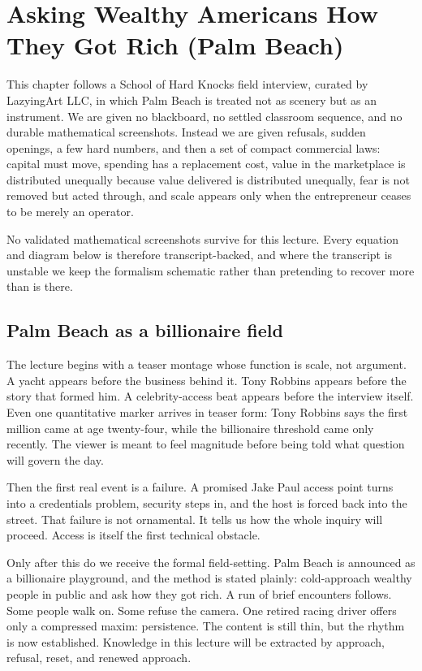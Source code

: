 \chapter{Asking Wealthy Americans How They Got Rich (Palm Beach)}

This chapter follows a School of Hard Knocks field interview, curated by LazyingArt LLC, in which Palm Beach is treated not as scenery but as an instrument. We are given no blackboard, no settled classroom sequence, and no durable mathematical screenshots. Instead we are given refusals, sudden openings, a few hard numbers, and then a set of compact commercial laws: capital must move, spending has a replacement cost, value in the marketplace is distributed unequally because value delivered is distributed unequally, fear is not removed but acted through, and scale appears only when the entrepreneur ceases to be merely an operator.

\begin{remark}
No validated mathematical screenshots survive for this lecture. Every equation and diagram below is therefore transcript-backed, and where the transcript is unstable we keep the formalism schematic rather than pretending to recover more than is there.
\end{remark}

\section{Palm Beach as a billionaire field}

The lecture begins with a teaser montage whose function is scale, not argument. A yacht appears before the business behind it. Tony Robbins appears before the story that formed him. A celebrity-access beat appears before the interview itself. Even one quantitative marker arrives in teaser form: Tony Robbins says the first million came at age twenty-four, while the billionaire threshold came only recently. The viewer is meant to feel magnitude before being told what question will govern the day.

Then the first real event is a failure. A promised Jake Paul access point turns into a credentials problem, security steps in, and the host is forced back into the street. That failure is not ornamental. It tells us how the whole inquiry will proceed. Access is itself the first technical obstacle.

Only after this do we receive the formal field-setting. Palm Beach is announced as a billionaire playground, and the method is stated plainly: cold-approach wealthy people in public and ask how they got rich. A run of brief encounters follows. Some people walk on. Some refuse the camera. One retired racing driver offers only a compressed maxim: persistence. The content is still thin, but the rhythm is now established. Knowledge in this lecture will be extracted by approach, refusal, reset, and renewed approach.

